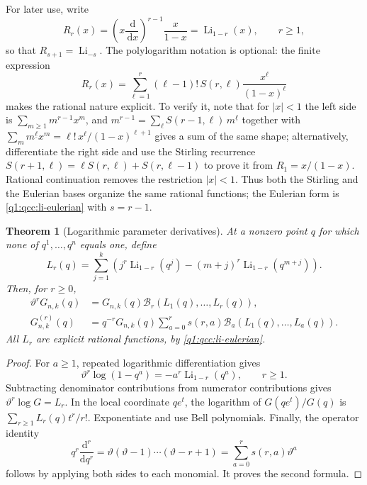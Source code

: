 \documentclass[11pt,a4paper,oneside,openany]{book}
\newtheorem{theorem}{Theorem}[chapter]
\theoremstyle{definition}
\theoremstyle{remark}
\newcommand{\Y}[1]{\mathcal B_{#1}}
\DeclareMathOperator{\Li}{Li}
\newcommand{\dd}{\,\mathrm d}
\newcommand{\logq}{\vartheta}
\begin{document}

For later use, write
\begin{equation}\label{q3:eq:Rr}
 R_r(x)=\left(x\frac{\dd}{\dd x}\right)^{r-1}\frac{x}{1-x}
       =\Li_{1-r}(x),\qquad r\ge1,
\end{equation}
so that \(R_{s+1}=\Li_{-s}\). The polylogarithm notation is optional: the
finite expression
\begin{equation}\label{q3:eq:Rr-stirling}
 R_r(x)=\sum_{\ell=1}^r(\ell-1)!\,S(r,\ell)\frac{x^\ell}{(1-x)^\ell}
\end{equation}
makes the rational nature explicit. To verify it, note that for \(|x|<1\)
the left side is \(\sum_{m\ge1}m^{r-1}x^m\), and
\(m^{r-1}=\sum_\ell S(r-1,\ell)\,m^{\underline\ell}\) together with
\(\sum_mm^{\underline\ell}x^m=\ell!\,x^\ell/(1-x)^{\ell+1}\) gives a sum of
the same shape; alternatively, differentiate the right side and use the
Stirling recurrence \(S(r+1,\ell)=\ell S(r,\ell)+S(r,\ell-1)\) to prove it
from \(R_1=x/(1-x)\). Rational continuation removes the restriction
\(|x|<1\). Thus both the Stirling and the Eulerian bases organize the same
rational functions; the Eulerian form is \eqref{q1:qcc:li-eulerian} with
\(s=r-1\).

\begin{theorem}[Logarithmic parameter derivatives]\label{q1:qcc:generic-jets}
At a nonzero point \(q\) for which none of \(q^1,\ldots,q^n\) equals
one, define
\begin{equation}\label{q1:qcc:L-r}
 L_r(q)=\sum_{j=1}^{k}
 \left(j^r\Li_{1-r}(q^j)-(m+j)^r\Li_{1-r}(q^{m+j})\right).
\end{equation}
Then, for \(r\ge0\),
\begin{align}
 \logq^rG_{n,k}(q)&=G_{n,k}(q)\Y r(L_1(q),\ldots,L_r(q)),
          \label{q1:qcc:theta-jets}\\
 G_{n,k}^{(r)}(q)&=q^{-r}G_{n,k}(q)
       \sum_{a=0}^r s(r,a)\Y a(L_1(q),\ldots,L_a(q)).
          \label{q1:qcc:q-jets}
\end{align}
All \(L_r\) are explicit rational functions, by
\eqref{q1:qcc:li-eulerian}.
\end{theorem}
\begin{proof}
For \(a\ge1\), repeated logarithmic differentiation gives
\[
 \logq^r\log(1-q^a)=-a^r\Li_{1-r}(q^a),\qquad r\ge1.
\]
Subtracting denominator contributions from numerator contributions gives
\(\logq^r\log G=L_r\). In the local coordinate \(q e^t\), the
logarithm of \(G(qe^t)/G(q)\) is
\(\sum_{r\ge1}L_r(q)t^r/r!\). Exponentiate and use Bell polynomials.
Finally, the operator identity
\begin{equation}\label{q1:qcc:stirling-operators}
 q^r\frac{\mathrm d^r}{\mathrm dq^r}
 =\logq(\logq-1)\cdots(\logq-r+1)
 =\sum_{a=0}^r s(r,a)\logq^a
\end{equation}
follows by applying both sides to each monomial. It proves the second formula.
\end{proof}
\end{document}
